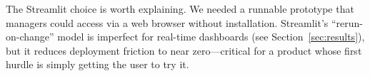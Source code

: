 The Streamlit choice is worth explaining. We needed a runnable prototype that managers could access via a web browser without installation. Streamlit's ``rerun-on-change'' model is imperfect for real-time dashboards (see Section~\ref{sec:results}), but it reduces deployment friction to near zero---critical for a product whose first hurdle is simply getting the user to try it.